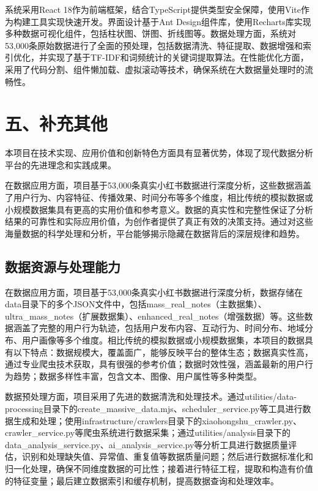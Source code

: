 \documentclass[12pt,a4paper]{article}
\begin{document}
系统采用React 18作为前端框架，结合TypeScript提供类型安全保障，使用Vite作为构建工具实现快速开发。界面设计基于Ant Design组件库，使用Recharts库实现多种数据可视化组件，包括柱状图、饼图、折线图等。数据处理方面，系统对53,000条原始数据进行了全面的预处理，包括数据清洗、特征提取、数据增强和索引优化，并实现了基于TF-IDF和词频统计的关键词提取算法。在性能优化方面，采用了代码分割、组件懒加载、虚拟滚动等技术，确保系统在大数据量处理时的流畅性。

\section*{五、补充其他}
\setcounter{section}{5}

本项目在技术实现、应用价值和创新特色方面具有显著优势，体现了现代数据分析平台的先进理念和实践成果。

在数据应用方面，项目基于53,000条真实小红书数据进行深度分析，这些数据涵盖了用户行为、内容特征、传播效果、时间分布等多个维度，相比传统的模拟数据或小规模数据集具有更高的实用价值和参考意义。数据的真实性和完整性保证了分析结果的可靠性和实际应用价值，为创作者提供了真正有效的决策支持。通过对这些海量数据的科学处理和分析，平台能够揭示隐藏在数据背后的深层规律和趋势。

\subsection{数据资源与处理能力}

在数据应用方面，项目基于53,000条真实小红书数据进行深度分析，数据存储在data目录下的多个JSON文件中，包括mass\_real\_notes（主数据集）、ultra\_mass\_notes（扩展数据集）、enhanced\_real\_notes（增强数据）等。这些数据涵盖了完整的用户行为轨迹，包括用户发布内容、互动行为、时间分布、地域分布、用户画像等多个维度。相比传统的模拟数据或小规模数据集，本项目的数据具有以下特点：数据规模大，覆盖面广，能够反映平台的整体生态；数据真实性高，通过专业爬虫技术获取，具有很强的参考价值；数据时效性强，涵盖最新的用户行为趋势；数据多样性丰富，包含文本、图像、用户属性等多种类型。

数据预处理方面，项目采用了先进的数据清洗和处理技术。通过utilities/data-processing目录下的create\_massive\_data.mjs、scheduler\_service.py等工具进行数据生成和处理；使用infrastructure/crawlers目录下的xiaohongshu\_crawler.py、crawler\_service.py等爬虫系统进行数据采集；通过utilities/analysis目录下的data\_analysis\_service.py、ai\_analysis\_service.py等分析工具进行数据质量评估，识别和处理缺失值、异常值、重复值等数据质量问题；然后进行数据标准化和归一化处理，确保不同维度数据的可比性；接着进行特征工程，提取和构造有价值的特征变量；最后建立数据索引和缓存机制，提高数据查询和处理效率。
\end{document}
